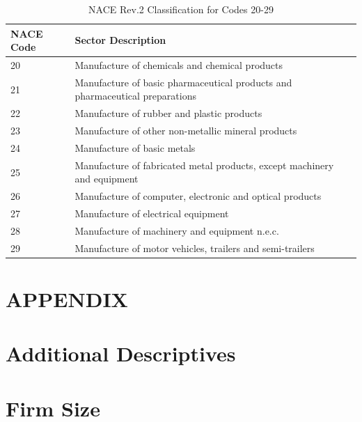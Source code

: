 \documentclass{article}
\begin{document}
\begin{table}[h]
    \centering
    \begin{tabular}{ll}
        \toprule
        \textbf{NACE Code} & \textbf{Sector Description} \\
        \midrule
        20 & Manufacture of chemicals and chemical products \\
        21 & Manufacture of basic pharmaceutical products and pharmaceutical preparations \\
        22 & Manufacture of rubber and plastic products \\
        23 & Manufacture of other non-metallic mineral products \\
        24 & Manufacture of basic metals \\
        25 & Manufacture of fabricated metal products, except machinery and equipment \\
        26 & Manufacture of computer, electronic and optical products \\
        27 & Manufacture of electrical equipment \\
        28 & Manufacture of machinery and equipment n.e.c. \\
        29 & Manufacture of motor vehicles, trailers and semi-trailers \\
        \bottomrule
    \end{tabular}
    \caption{NACE Rev.2 Classification for Codes 20-29}
    \label{tab:nace20_29}
\end{table}

















\section*{APPENDIX}
\section*{Additional Descriptives}
\section{Firm Size}
\end{document}
